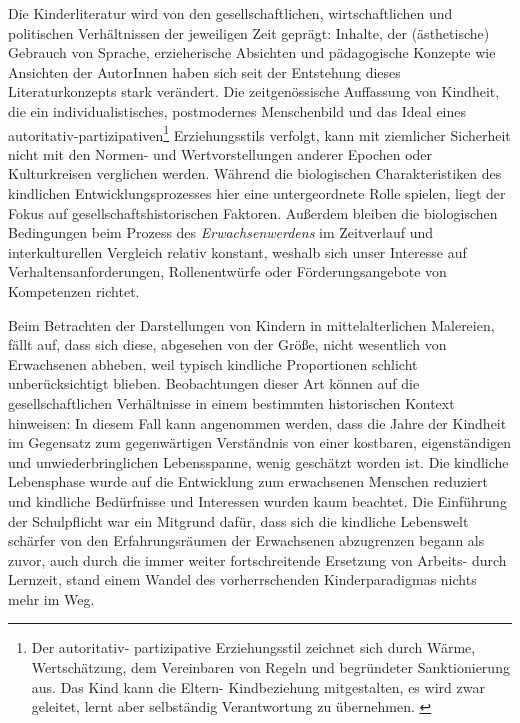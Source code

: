     Die Kinderliteratur wird von den gesellschaftlichen, wirtschaftlichen und
    politischen Verhältnissen der jeweiligen Zeit geprägt: Inhalte, der
    (ästhetische) Gebrauch von Sprache, erzieherische Absichten und pädagogische
    Konzepte wie Ansichten der AutorInnen haben sich seit der Entstehung dieses
    Literaturkonzepts stark verändert.  Die zeitgenössische Auffassung von
    Kindheit, die ein individualistisches, postmodernes Menschenbild und das
    Ideal eines autoritativ-partizipativen\footnote{Der autoritativ-
    partizipative Erziehungsstil  zeichnet sich durch Wärme, Wertschätzung, dem
    Vereinbaren von Regeln und begründeter Sanktionierung aus. Das Kind kann die
    Eltern- Kindbeziehung mitgestalten, es wird zwar geleitet, lernt aber
    selbständig Verantwortung zu übernehmen. \parencite[35]{Kuttler2009}}
    Erziehungsstils verfolgt, kann mit ziemlicher Sicherheit nicht mit den
    Normen- und Wertvorstellungen anderer Epochen oder Kulturkreisen verglichen
    werden. Während die biologischen Charakteristiken des kindlichen
    Entwicklungsprozesses hier eine untergeordnete Rolle spielen, liegt der
    Fokus auf gesellschaftshistorischen Faktoren. Außerdem bleiben die
    biologischen Bedingungen beim Prozess des \emph{Erwachsenwerdens} im
    Zeitverlauf und  interkulturellen Vergleich relativ konstant, weshalb sich
    unser Interesse  auf Verhaltensanforderungen, Rollenentwürfe oder
    Förderungsangebote von  Kompetenzen richtet.

    Beim Betrachten der Darstellungen von Kindern in mittelalterlichen
    Malereien, fällt auf, dass sich diese, abgesehen von der Größe, nicht
    wesentlich von Erwachsenen abheben, weil typisch kindliche Proportionen
    schlicht unberücksichtigt blieben. \parencite[53]{Sigmund2010} Beobachtungen
    dieser Art können auf die gesellschaftlichen Verhältnisse in einem
    bestimmten historischen Kontext hinweisen: In diesem Fall kann angenommen
    werden, dass die Jahre der Kindheit im Gegensatz zum gegenwärtigen
    Verständnis von einer kostbaren, eigenständigen und unwiederbringlichen
    Lebensspanne, wenig geschätzt worden ist. Die kindliche Lebensphase wurde
    auf die Entwicklung zum erwachsenen Menschen reduziert und  kindliche
    Bedürfnisse und Interessen wurden kaum beachtet. Die Einführung der
    Schulpflicht war ein Mitgrund dafür, dass sich die kindliche Lebenswelt
    schärfer von den Erfahrungsräumen der Erwachsenen abzugrenzen begann als
    zuvor, auch durch die immer weiter fortschreitende Ersetzung von Arbeits-
    durch Lernzeit, stand einem Wandel des vorherrschenden Kinderparadigmas
    nichts mehr im Weg.

